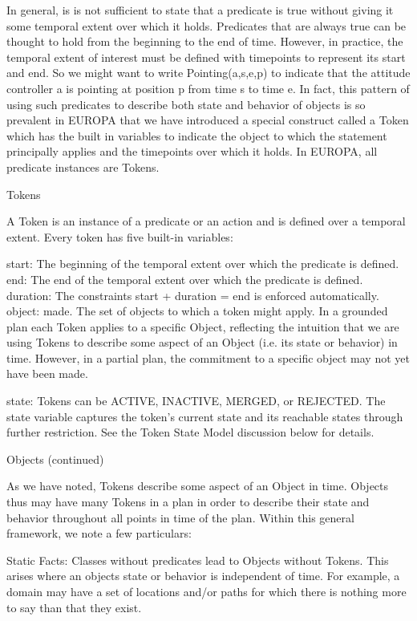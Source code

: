 In general, is is not sufficient to state that a predicate is true
without giving it some temporal extent over which it holds. Predicates
that are always true can be thought to hold from the beginning to the
end of time. However, in practice, the temporal extent of interest
must be defined with timepoints to represent its start and end. So we
might want to write Pointing(a,s,e,p) to indicate that the attitude
controller a is pointing at position p from time s to time e. In fact,
this pattern of using such predicates to describe both state and
behavior of objects is so prevalent in EUROPA that we have introduced
a special construct called a Token which has the built in variables to
indicate the object to which the statement principally applies and the
timepoints over which it holds. In EUROPA, all predicate instances are
Tokens.

Tokens

A Token is an instance of a predicate or an action and is defined over
a temporal extent. Every token has five built-in variables:

start: The beginning of the temporal extent over which the predicate
is defined.  end: The end of the temporal extent over which the
predicate is defined.  duration: The constraints start + duration =
end is enforced automatically.  object: made. The set of objects to
which a token might apply. In a grounded plan each Token applies to a
specific Object, reflecting the intuition that we are using Tokens to
describe some aspect of an Object (i.e. its state or behavior) in
time. However, in a partial plan, the commitment to a specific object
may not yet have been made.

state: Tokens can be ACTIVE, INACTIVE, MERGED, or REJECTED. The state
variable captures the token's current state and its reachable states
through further restriction. See the Token State Model discussion
below for details.

Objects (continued)

As we have noted, Tokens describe some aspect of an Object in
time. Objects thus may have many Tokens in a plan in order to describe
their state and behavior throughout all points in time of the
plan. Within this general framework, we note a few particulars:

Static Facts: Classes without predicates lead to Objects without
Tokens. This arises where an objects state or behavior is independent
of time. For example, a domain may have a set of locations and/or
paths for which there is nothing more to say than that they exist.

